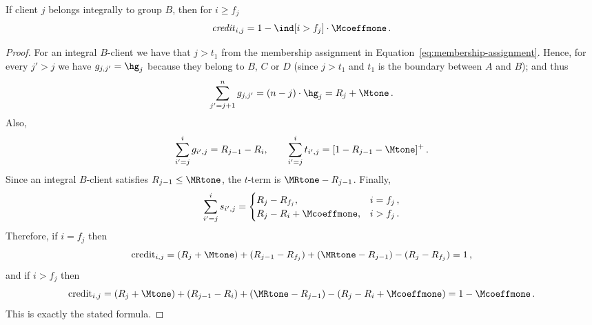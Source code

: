 \begin{lemma}
\label{lem:credit-B-after}
    If client $j$ belongs integrally to group $B$, then for $i \geq f_j$
    \begin{equation*}
        \text{\emph{credit}}_{i,j} = 1 - \ind[i > f_j] \cdot \Mcoeffmone\,.
    \end{equation*}
\end{lemma}
\begin{proof}
    For an integral $B$-client we have that $j>t_1$ from the membership assignment in Equation~\ref{eq:membership-assignment}. Hence, for every $j' > j$ we have $g_{j,j'} = \hg_j$ because they belong to $B$, $C$ or $D$ (since $j>t_1$ and $t_1$ is the boundary between $A$ and $B$); and thus
    \begin{equation*}
        \sum_{j'=j+1}^n g_{j,j'} = (n-j) \cdot \hg_j = R_j + \Mtone\,.
    \end{equation*}
    Also,
    \begin{equation*}
        \sum_{i'=j}^{i} g_{i',j} = R_{j-1}-R_i,
        \qquad
        \sum_{i'=j}^{i} t_{i',j} = [1-R_{j-1}-\Mtone]^+\,.
    \end{equation*}
    Since an integral $B$-client satisfies $R_{j-1} \le \MRtone$, the $t$-term is $\MRtone-R_{j-1}$.
    Finally,
    \begin{equation*}
        \sum_{i'=j}^{i} s_{i',j} =
        \begin{cases}
            R_j-R_{f_j}, & i=f_j\,,\\
            R_j-R_i+\Mcoeffmone, & i>f_j\,.
        \end{cases}
    \end{equation*}
    Therefore, if $i=f_j$ then
    \begin{equation*}
        \text{credit}_{i,j} = (R_j+\Mtone) + (R_{j-1}-R_{f_j}) + (\MRtone-R_{j-1}) - (R_j-R_{f_j}) = 1\,,
    \end{equation*}
    and if $i>f_j$ then
    \begin{equation*}
        \text{credit}_{i,j} = (R_j+\Mtone) + (R_{j-1}-R_i) + (\MRtone-R_{j-1}) - (R_j-R_i+\Mcoeffmone) = 1-\Mcoeffmone\,.
    \end{equation*}
    This is exactly the stated formula.
\end{proof}

